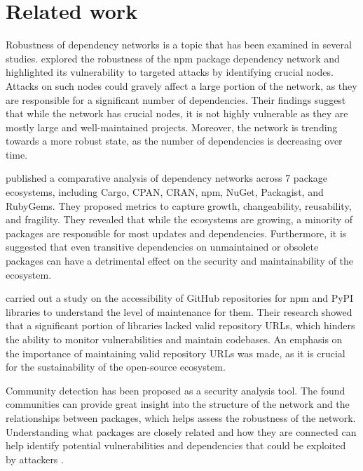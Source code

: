 \documentclass[9pt,twocolumn,twoside]{pnas-report}
\begin{document}


\section*{Related work}

Robustness of dependency networks is a topic that has been examined in several studies.
\cite{hafner2021robustness} explored the robustness of the npm package dependency network and highlighted its vulnerability to targeted attacks by identifying crucial nodes.
Attacks on such nodes could gravely affect a large portion of the network, as they are responsible for a significant number of dependencies.
Their findings suggest that while the network has crucial nodes, it is not highly vulnerable as they are mostly large and well-maintained projects.
Moreover, the network is trending towards a more robust state, as the number of dependencies is decreasing over time.

\cite{decan2018evolution} published a comparative analysis of dependency networks across 7 package ecosystems, including Cargo, CPAN, CRAN, npm, NuGet, Packagist, and RubyGems.
They proposed metrics to capture growth, changeability, reusability, and fragility.
They revealed that while the ecosystems are growing, a minority of packages are responsible for most updates and dependencies.
Furthermore, it is suggested that even transitive dependencies on unmaintained or obsolete packages can have a detrimental effect on the security and maintainability of the ecosystem.

\cite{tsakpinis2024accessibility} carried out a study on the accessibility of GitHub repositories for npm and PyPI libraries to understand the level of maintenance for them.
Their research showed that a significant portion of libraries lacked valid repository URLs, which hinders the ability to monitor vulnerabilities and maintain codebases.
An emphasis on the importance of maintaining valid repository URLs was made, as it is crucial for the sustainability of the open-source ecosystem.

Community detection has been proposed as a security analysis tool.
The found communities can provide great insight into the structure of the network and the relationships between packages, which helps assess the robustness of the network.
Understanding what packages are closely related and how they are connected can help identify potential vulnerabilities and dependencies that could be exploited by attackers \cite{hafner2021robustness, tsakpinis2024accessibility}.
\end{document}
